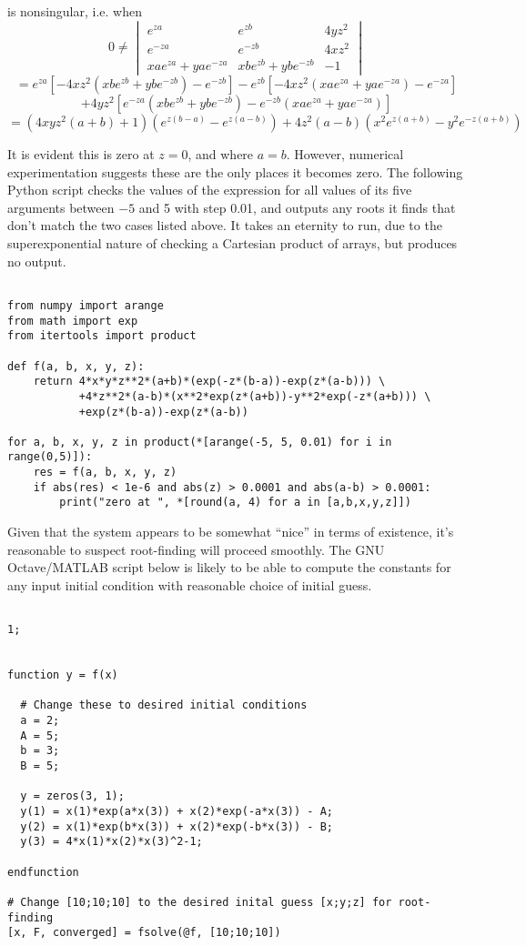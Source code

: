 \documentclass{article}
\begin{document}
is nonsingular, i.e. when
\[0\neq \begin{vmatrix}
    e^{za} & e^{zb} & 4yz^2 \\
    e^{-za} & e^{-zb} & 4xz^2 \\
    xae^{za}+yae^{-za} & xbe^{zb}+ybe^{-zb} & -1
  \end{vmatrix} \]
\[=e^{za}\left[ -4xz^2\left( xbe^{zb}+ybe^{-zb} \right)-e^{-zb}\right]-e^{zb}\left[ -4xz^2\left( xae^{za}+yae^{-za} \right) -e^{-za}\right]\]
\[+4yz^2\left[ e^{-za}\left( xbe^{zb}+ybe^{-zb} \right)-e^{-zb}\left( xae^{za}+yae^{-za} \right) \right]\]
\[=(4xyz^2(a+b)+1)\left( e^{z(b-a)}-e^{z(a-b)} \right)+4z^2(a-b)\left( x^2e^{z(a+b)}-y^2e^{-z(a+b)}\right) \]

It is evident this is zero at $z=0$, and where $a=b$.
However, numerical experimentation suggests these are the only places it becomes zero. The following Python script checks the values of the expression for all values of its five arguments between $-5$ and 5 with step 0.01, and outputs any roots it finds that don't match the two cases listed above. It takes an eternity to run, due to the superexponential nature of checking a Cartesian product of arrays, but produces no output.
\begin{verbatim}

from numpy import arange
from math import exp
from itertools import product

def f(a, b, x, y, z):
    return 4*x*y*z**2*(a+b)*(exp(-z*(b-a))-exp(z*(a-b))) \
           +4*z**2*(a-b)*(x**2*exp(z*(a+b))-y**2*exp(-z*(a+b))) \
           +exp(z*(b-a))-exp(z*(a-b))

for a, b, x, y, z in product(*[arange(-5, 5, 0.01) for i in range(0,5)]):
    res = f(a, b, x, y, z)
    if abs(res) < 1e-6 and abs(z) > 0.0001 and abs(a-b) > 0.0001:
        print("zero at ", *[round(a, 4) for a in [a,b,x,y,z]])

\end{verbatim}

Given that the system appears to be somewhat ``nice'' in terms of existence, it's reasonable to suspect root-finding will proceed smoothly.
The GNU Octave/MATLAB script below is likely to be able to compute the constants for any input initial condition with reasonable choice of initial guess.
\newpage
\begin{verbatim}

1;


function y = f(x)

  # Change these to desired initial conditions
  a = 2;
  A = 5;
  b = 3;
  B = 5;

  y = zeros(3, 1);
  y(1) = x(1)*exp(a*x(3)) + x(2)*exp(-a*x(3)) - A;
  y(2) = x(1)*exp(b*x(3)) + x(2)*exp(-b*x(3)) - B;
  y(3) = 4*x(1)*x(2)*x(3)^2-1;

endfunction

# Change [10;10;10] to the desired inital guess [x;y;z] for root-finding
[x, F, converged] = fsolve(@f, [10;10;10])


\end{verbatim}
\end{document}
